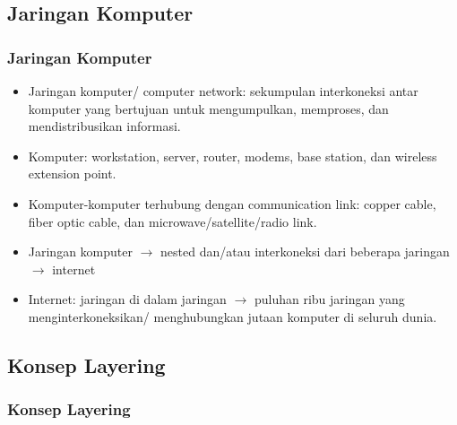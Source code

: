 \documentclass[pdflatex,compress]{beamer}
\begin{document}
\subsection{Jaringan Komputer}

\begin{frame}
	\frametitle{Jaringan Komputer}
	\begin{itemize}
		\item Jaringan komputer/ computer network: sekumpulan interkoneksi antar komputer yang bertujuan untuk mengumpulkan, memproses, dan mendistribusikan informasi.
		\item Komputer: workstation, server, router, modems, base station, dan wireless extension point.
		\item Komputer-komputer terhubung dengan communication link: copper cable, fiber optic cable, dan microwave/satellite/radio link.
		\item Jaringan komputer $\rightarrow$ nested dan/atau interkoneksi dari beberapa jaringan $\rightarrow$ internet
		\item Internet: jaringan di dalam jaringan $\rightarrow$ puluhan ribu jaringan yang menginterkoneksikan/ menghubungkan jutaan komputer di seluruh dunia.
	\end{itemize}
\end{frame}

\subsection{Konsep Layering}

\begin{frame}
	\frametitle{Konsep Layering}
	
\end{frame}
\end{document}
